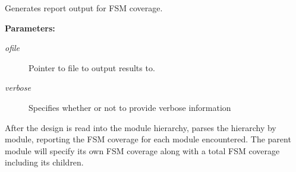 Generates report output for FSM coverage.

\begin{Desc}
\item[{\bf Parameters: }]\par
\begin{description}
\item[
{\em ofile}]Pointer to file to output results to. \item[
{\em verbose}]Specifies whether or not to provide verbose information

\end{description}
\end{Desc}
After the design is read into the module hierarchy, parses the hierarchy by module, reporting the FSM coverage for each module encountered. The parent module will specify its own FSM coverage along with a total FSM coverage including its  children. 